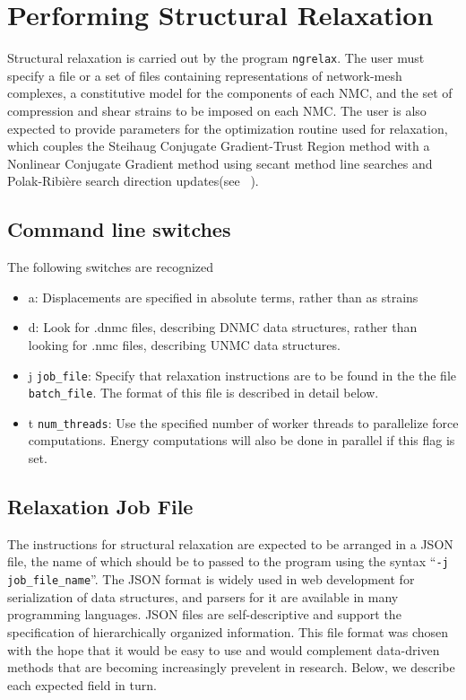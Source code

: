 \documentclass{article}
\begin{document}
\section{Performing Structural Relaxation}
Structural relaxation is carried out by the program \texttt{ngrelax}. The
user must specify a file or a set of files containing representations of
network-mesh complexes, a constitutive model for the components of each NMC,
and the set of compression and shear strains to be imposed on each NMC. The
user is also expected to provide parameters for the optimization routine
used for relaxation, which couples the Steihaug Conjugate Gradient-Trust Region
method with a Nonlinear Conjugate Gradient method using secant method line
searches and Polak-Ribi\`ere search direction updates(see 
~\cite{nocedal_wright, steihaug, shewchuk_cg}).

\subsection{Command line switches}
The following switches are recognized

\begin{itemize}
\item[-]a: Displacements are specified in absolute terms, rather than as strains
\item[-]d: Look for .dnmc files, describing DNMC data structures, rather than looking for .nmc files, describing UNMC data structures.
\item[-]j \texttt{job\_file}: Specify that relaxation instructions are to be found in the the file \texttt{batch\_file}. The format of this file is described in detail below.
\item[-]t \texttt{num\_threads}: Use the specified number of worker threads
to parallelize force computations. Energy computations will also be done in
parallel if this flag is set.
\end{itemize}

\subsection{Relaxation Job File}
The instructions for structural relaxation are expected to be arranged in
a JSON file, the name of which should be to passed to the program using the
syntax ``\texttt{-j job\_file\_name}''. The JSON format is widely used in web 
development for serialization of data structures, and parsers for it are 
available in many programming languages. JSON files are self-descriptive and
support the specification of hierarchically organized information. This file
format was chosen with the hope that it would be easy to use and would
complement data-driven methods that are becoming increasingly prevelent in
research. Below, we describe each expected field in turn.
\end{document}
